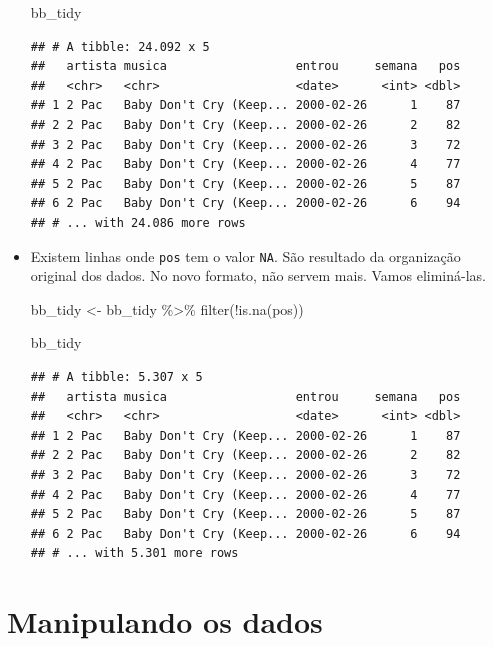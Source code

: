 \documentclass[
  11pt]{report}
\newenvironment{Shaded}{\begin{snugshade}}{\end{snugshade}}
\newcommand{\FunctionTok}[1]{\textcolor[rgb]{0.00,0.00,0.00}{#1}}
\newcommand{\NormalTok}[1]{#1}
\newcommand{\OtherTok}[1]{\textcolor[rgb]{0.56,0.35,0.01}{#1}}
\newcommand{\SpecialCharTok}[1]{\textcolor[rgb]{0.00,0.00,0.00}{#1}}
\renewenvironment{Shaded}{
    \begin{mdframed}[%
      roundcorner=2pt,%
      innerleftmargin=5pt,%
      innerrightmargin=5pt,%
      topline=true,%
      leftline=true,%
      rightline=true,%
      bottomline=true,%
      linewidth=0.5pt,%
      linecolor=black!20,%
      backgroundcolor=black!2,%
      skipabove=2ex,%
      skipbelow=2.5ex%
    ]%
  }
  {
    \end{mdframed}
  }
\begin{document}
\begin{itemize}
\begin{Shaded}
\begin{Highlighting}[]
\NormalTok{bb\_tidy}
\end{Highlighting}
\end{Shaded}

\begin{verbatim}
## # A tibble: 24.092 x 5
##   artista musica                  entrou     semana   pos
##   <chr>   <chr>                   <date>      <int> <dbl>
## 1 2 Pac   Baby Don't Cry (Keep... 2000-02-26      1    87
## 2 2 Pac   Baby Don't Cry (Keep... 2000-02-26      2    82
## 3 2 Pac   Baby Don't Cry (Keep... 2000-02-26      3    72
## 4 2 Pac   Baby Don't Cry (Keep... 2000-02-26      4    77
## 5 2 Pac   Baby Don't Cry (Keep... 2000-02-26      5    87
## 6 2 Pac   Baby Don't Cry (Keep... 2000-02-26      6    94
## # ... with 24.086 more rows
\end{verbatim}
\item
  Existem linhas onde \texttt{pos} tem o valor \texttt{NA}. São resultado da organização original dos dados. No novo formato, não servem mais. Vamos eliminá-las.

\begin{Shaded}
\begin{Highlighting}[]
\NormalTok{bb\_tidy }\OtherTok{\textless{}{-}}\NormalTok{ bb\_tidy }\SpecialCharTok{\%\textgreater{}\%} 
  \FunctionTok{filter}\NormalTok{(}\SpecialCharTok{!}\FunctionTok{is.na}\NormalTok{(pos))}

\NormalTok{bb\_tidy}
\end{Highlighting}
\end{Shaded}

\begin{verbatim}
## # A tibble: 5.307 x 5
##   artista musica                  entrou     semana   pos
##   <chr>   <chr>                   <date>      <int> <dbl>
## 1 2 Pac   Baby Don't Cry (Keep... 2000-02-26      1    87
## 2 2 Pac   Baby Don't Cry (Keep... 2000-02-26      2    82
## 3 2 Pac   Baby Don't Cry (Keep... 2000-02-26      3    72
## 4 2 Pac   Baby Don't Cry (Keep... 2000-02-26      4    77
## 5 2 Pac   Baby Don't Cry (Keep... 2000-02-26      5    87
## 6 2 Pac   Baby Don't Cry (Keep... 2000-02-26      6    94
## # ... with 5.301 more rows
\end{verbatim}
\end{itemize}

\hypertarget{manipulando-os-dados}{%
\section{Manipulando os dados}\label{manipulando-os-dados}}
\end{document}
